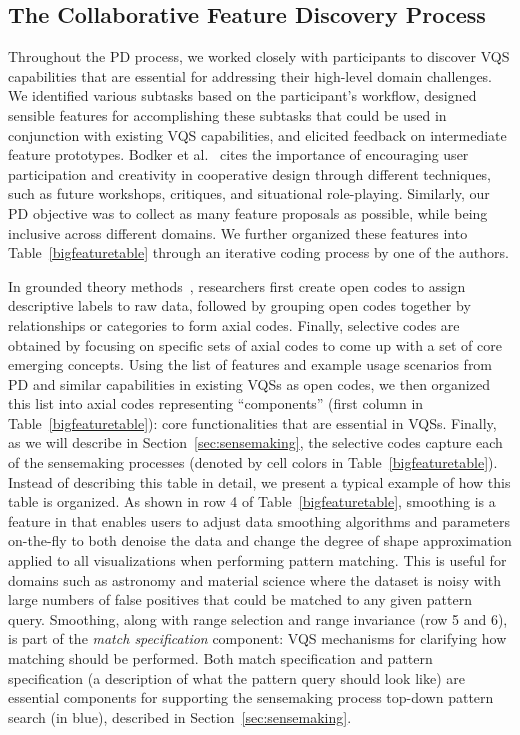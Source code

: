 {  \subsection{The Collaborative Feature Discovery Process~\label{sec:feature_dsicovery}}
  \par Throughout the PD process, we worked closely with participants to discover VQS capabilities that are essential for addressing their high-level domain challenges. We identified various subtasks based on the participant's workflow, designed sensible features for accomplishing these subtasks that could be used in conjunction with existing VQS capabilities, and elicited feedback on intermediate feature prototypes. Bodker et al.~\cite{BodkerGronbaek} cites the importance of encouraging user participation and creativity in cooperative design through different techniques, such as future workshops, critiques, and situational role-playing. Similarly, our PD objective was to collect as many feature proposals as possible, while being inclusive across different domains. We further organized these features into Table~\ref{bigfeaturetable} through an iterative coding process by one of the authors.
  \par In grounded theory methods~\cite{Muller2012}, researchers first create open codes to assign descriptive labels to raw data, followed by grouping open codes together by relationships or categories to form axial codes. Finally, selective codes are obtained by focusing on specific sets of axial codes to come up with a set of core emerging concepts. Using the list of features and example usage scenarios from PD and similar capabilities in existing VQSs as open codes, we then organized this list into axial codes representing ``components'' (first column in Table~\ref{bigfeaturetable}): core functionalities that are essential in VQSs. Finally, as we will describe in Section~\ref{sec:sensemaking}, the selective codes capture each of the sensemaking processes (denoted by cell colors in Table~\ref{bigfeaturetable}). Instead of describing this table in detail, we present a typical example of how this table is organized. As shown in row 4 of Table~\ref{bigfeaturetable}, smoothing is a feature in \zvpp that enables users to adjust data smoothing algorithms and parameters on-the-fly to both denoise the data and change the degree of shape approximation applied to all visualizations when performing pattern matching. This is useful for domains such as astronomy and material science where the dataset is noisy with large numbers of false positives that could be matched to any given pattern query. Smoothing, along with range selection and range invariance (row 5 and 6), is part of the \emph{match specification} component: VQS mechanisms for clarifying how matching should be performed. Both match specification and pattern specification (a description of what the pattern query should look like) are essential components for supporting the sensemaking process top-down pattern search (in blue), described in Section~\ref{sec:sensemaking}.
}
